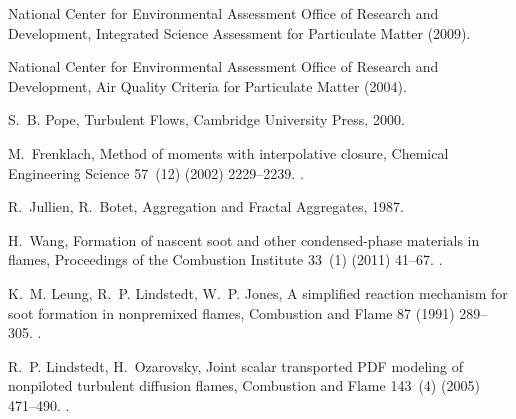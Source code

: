 \documentclass[preprint,letterpaper]{elsarticle}
\begin{document}

%
\begin{thebibliography}{00}

{National Center for Environmental Assessment Office of Research and
Development}, {Integrated Science Assessment for Particulate Matter} (2009).

{National Center for Environmental Assessment Office of Research and
Development}, {Air Quality Criteria for Particulate Matter} (2004).

S.~B. Pope, {Turbulent Flows}, {Cambridge University Press}, 2000.

M.~Frenklach, {Method of moments with interpolative closure}, {Chemical
Engineering Science} 57~(12) (2002) 2229--2239.
\newblock \href {http://dx.doi.org/10.1016/S0009-2509(02)00113-6}
  {}.

R.~Jullien, R.~Botet, {Aggregation and Fractal Aggregates}, 1987.

H.~Wang, {Formation of nascent soot and other condensed-phase materials in
flames}, {Proceedings of the Combustion Institute} 33~(1) (2011) 41--67.
\newblock \href {http://dx.doi.org/10.1016/j.proci.2010.09.009}
  {}.

K.~M. Leung, R.~P. Lindstedt, W.~P. Jones, {A simplified reaction mechanism for
soot formation in nonpremixed flames}, {Combustion and Flame} 87 (1991)
289--305.
\newblock \href {http://dx.doi.org/10.1016/0010-2180(91)90114-q}
  {}.

R.~P. Lindstedt, H.~Ozarovsky, {Joint scalar transported {PDF} modeling of
nonpiloted turbulent diffusion flames}, {Combustion and Flame} 143~(4) (2005)
471--490.
\newblock \href {http://dx.doi.org/10.1016/j.combustflame.2005.08.030}
  {}.


\end{thebibliography}
\end{document}
